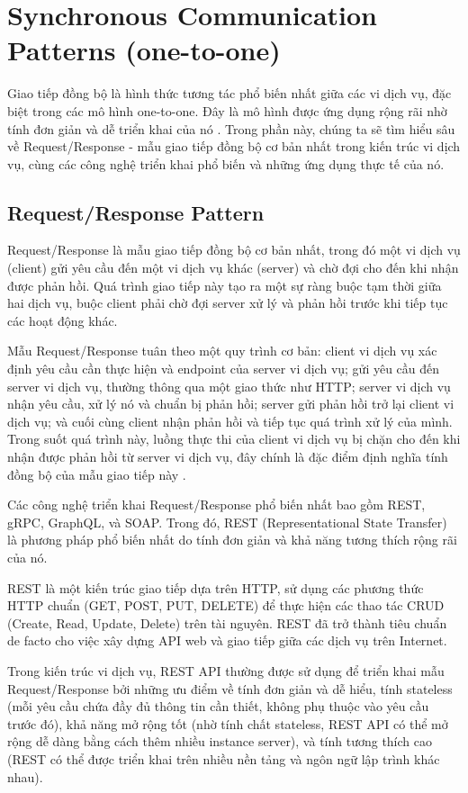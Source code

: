 \section{Synchronous Communication Patterns (one-to-one)}
Giao tiếp đồng bộ là hình thức tương tác phổ biến nhất giữa các vi dịch vụ, đặc biệt trong các mô hình one-to-one. Đây là mô hình được ứng dụng rộng rãi nhờ tính đơn giản và dễ triển khai của nó \cite{newman2015}. Trong phần này, chúng ta sẽ tìm hiểu sâu về Request/Response - mẫu giao tiếp đồng bộ cơ bản nhất trong kiến trúc vi dịch vụ, cùng các công nghệ triển khai phổ biến và những ứng dụng thực tế của nó.

\subsection{Request/Response Pattern}
Request/Response là mẫu giao tiếp đồng bộ cơ bản nhất, trong đó một vi dịch vụ (client) gửi yêu cầu đến một vi dịch vụ khác (server) và chờ đợi cho đến khi nhận được phản hồi. Quá trình giao tiếp này tạo ra một sự ràng buộc tạm thời giữa hai dịch vụ, buộc client phải chờ đợi server xử lý và phản hồi trước khi tiếp tục các hoạt động khác.

Mẫu Request/Response tuân theo một quy trình cơ bản: client vi dịch vụ xác định yêu cầu cần thực hiện và endpoint của server vi dịch vụ; gửi yêu cầu đến server vi dịch vụ, thường thông qua một giao thức như HTTP; server vi dịch vụ nhận yêu cầu, xử lý nó và chuẩn bị phản hồi; server gửi phản hồi trở lại client vi dịch vụ; và cuối cùng client nhận phản hồi và tiếp tục quá trình xử lý của mình. Trong suốt quá trình này, luồng thực thi của client vi dịch vụ bị chặn cho đến khi nhận được phản hồi từ server vi dịch vụ, đây chính là đặc điểm định nghĩa tính đồng bộ của mẫu giao tiếp này \cite{newman2015}.

Các công nghệ triển khai Request/Response phổ biến nhất bao gồm REST, gRPC, GraphQL, và SOAP. Trong đó, REST (Representational State Transfer) là phương pháp phổ biến nhất do tính đơn giản và khả năng tương thích rộng rãi của nó.

REST là một kiến trúc giao tiếp dựa trên HTTP, sử dụng các phương thức HTTP chuẩn (GET, POST, PUT, DELETE) để thực hiện các thao tác CRUD (Create, Read, Update, Delete) trên tài nguyên. REST đã trở thành tiêu chuẩn de facto cho việc xây dựng API web và giao tiếp giữa các dịch vụ trên Internet.

Trong kiến trúc vi dịch vụ, REST API thường được sử dụng để triển khai mẫu Request/Response bởi những ưu điểm về tính đơn giản và dễ hiểu, tính stateless (mỗi yêu cầu chứa đầy đủ thông tin cần thiết, không phụ thuộc vào yêu cầu trước đó), khả năng mở rộng tốt (nhờ tính chất stateless, REST API có thể mở rộng dễ dàng bằng cách thêm nhiều instance server), và tính tương thích cao (REST có thể được triển khai trên nhiều nền tảng và ngôn ngữ lập trình khác nhau).

